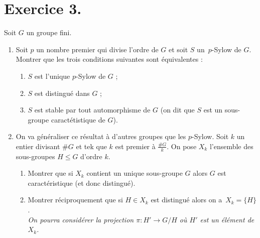 \documentclass[./main]{subfiles}
\begin{document}
  \section{Exercice 3.} \label{td3-ex3}
  \begin{enonce}
    Soit $G$ un groupe fini.
    \begin{enumerate}
      \item Soit $p$ un nombre premier qui divise l'ordre de $G$ et soit $S$ un~$p$-Sylow de $G$.
        Montrer que les trois conditions suivantes sont équivalentes :
        \begin{enumerate}
          \item $S$ est l'unique $p$-Sylow de $G$ ; \label{td3-ex3-q1a}
          \item $S$  est distingué dans $G$ ; \label{td3-ex3-q1b}
          \item $S$ est stable par tout automorphisme de $G$ (on dit que $S$ est un sous-groupe caractétistique de $G$). \label{td3-ex3-q1c}
        \end{enumerate}
      \item On va généraliser ce résultat à d'autres groupes que les $p$-Sylow. Soit $k$ un entier divisant $\#G$ et tek que $k$ est premier à $\frac{\#G}{k}$.
        On pose $X_k$ l'ensemble des sous-groupes $H \le G$ d'ordre $k$.
        \begin{enumerate}
          \item Montrer que si $X_k$ contient un unique sous-groupe $G$ alors $G$ est caractéristique (et donc distingué).
          \item Montrer réciproquement que si $H \in X_k$ est distingué alors on a~$X_k = \{H\}$.\\
            \textit{On pourra considérer la projection $\pi : H' \to G / H$ où $H'$ est un élément de $X_k$.}
        \end{enumerate}
    \end{enumerate}
  \end{enonce}
\end{document}
